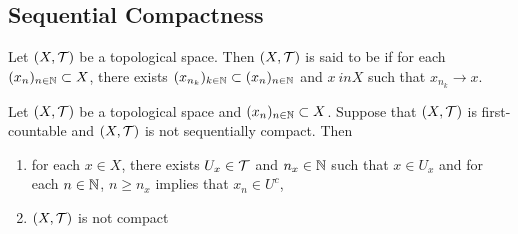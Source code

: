 \documentclass{book}
\begin{document}
 
 
 
 
 
 
 
 
 
 
 
 
 
 
 
 
 
 
 
 
 
 
 
 
 
 
 
 
 
 
 
 
 
 
 
 
 
 
 
 
 \subsection{Sequential Compactness}
 
 \begin{defn}  
 	Let $(X, \mathcal{T})$ be a topological space. Then $(X, \mathcal{T})$ is said to be  if for each $(x_n)_{n \in \mathbb{N}} \subset X$, there exists $(x_{n_k})_{k \in \mathbb{N}} \subset (x_n)_{n \in \mathbb{N}}$ and $x \ in X$ such that $x_{n_k} \rightarrow x$.   
 \end{defn}

\begin{ex} 
	Let $(X, \mathcal{T})$ be a topological space and $(x_n)_{n \in \mathbb{N}} \subset X$. Suppose that $(X, \mathcal{T})$ is first-countable and $(X, \mathcal{T})$ is not sequentially compact. Then
	\begin{enumerate}
		\item for each $x \in X$, there exists $U_x \in \mathcal{T}$ and $n_x \in \mathbb{N}$ such that $x \in U_x$ and for each $n \in \mathbb{N}$, $n \geq n_x$ implies that $x_n \in U^c$, \\
		 
		\item $(X, \mathcal{T})$ is not compact
	\end{enumerate}
\end{ex}
\end{document}
